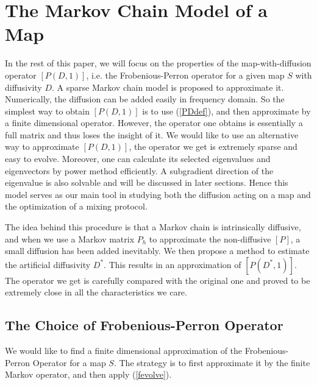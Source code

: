 \documentclass{article}
\begin{document}
\section{The Markov Chain Model of a Map}
\label{The Markov Chain Model of a Map}
In the rest of this paper, we will focus on the properties of the
map-with-diffusion operator $[P(D,1)]$, i.e. the Frobenious-Perron
operator for a given map $S$ with diffusivity $D$. A sparse Markov
chain model is proposed to approximate it. Numerically, the
diffusion can be added easily in frequency domain. So the simplest
way to obtain $[P(D,1)]$ is to use (\ref{PDdef}), and then
approximate by a finite dimensional operator. However, the operator
one obtains is essentially a full matrix and thus loses the insight
of it. We would like to use an alternative way to approximate
$[P(D,1)]$, the operator we get is extremely sparse and easy to
evolve. Moreover, one can calculate its selected eigenvalues and
eigenvectors by power method efficiently. A subgradient direction of
the eigenvalue is also solvable and will be discussed in later
sections. Hence this model serves as our main tool in studying both
the diffusion acting on a map and the optimization of a mixing
protocol.

The idea behind this procedure is that a Markov chain is
intrinsically diffusive, and when we use a Markov matrix $P_h$ to
approximate the non-diffusive $[P]$, a small diffusion has been
added inevitably. We then propose a method to estimate the
artificial diffusivity $D^*$. This results in an approximation of
$[P(D^*,1)]$. The operator we get is carefully compared with the
original one and proved to be extremely close in all the
characteristics we care.


\subsection{The Choice of Frobenious-Perron Operator}

We would like to find a finite dimensional approximation of the
Frobenious-Perron Operator for a map $S$. The strategy is to first
approximate it by the finite Markov operator, and then apply
(\ref{fevolve}).
\end{document}
